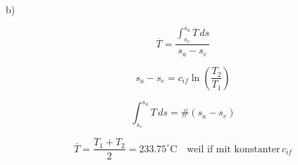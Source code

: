 b)

\[
\overline{T} = \frac{\int_{s_e}^{s_a} T \, ds}{s_a - s_e}
\]

\[
s_a - s_e = c_{if} \ln \left( \frac{T_2}{T_1} \right)
\]

\[
\int_{s_e}^{s_a} T \, ds = \# (s_a - s_e)
\]

\[
\overline{T} = \frac{T_1 + T_2}{2} = 233.75^\circ \text{C} \quad \text{weil if mit konstanter} \, c_{if}
\]